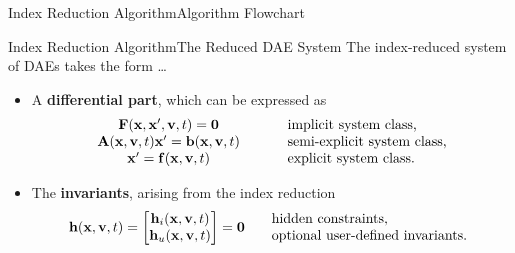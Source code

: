\begin{frame}{Index Reduction Algorithm}{Algorithm Flowchart}
  \centering
\end{frame}

\begin{frame}{Index Reduction Algorithm}{The Reduced \ac{DAE} System}
  The index-reduced system of \acp{DAE} takes the form \dots
  \begin{itemize}[<+->]
    \item A \textbf{differential part}, which can be expressed as
    \begin{equation*}
      \begin{array}{ccl}
          \mathbf{F}(\mathbf{x}, \mathbf{x}^\prime, \mathbf{v}, t) = \mathbf{0} & \hspace{0.5cm} & \text{implicit  system class,} \\
          \mathbf{A}(\mathbf{x}, \mathbf{v}, t) \mathbf{x}^\prime = \mathbf{b}(\mathbf{x}, \mathbf{v}, t) & \hspace{0.5cm} & \text{semi-explicit system class,} \\
          \mathbf{x}^\prime = \mathbf{f}(\mathbf{x}, \mathbf{v}, t) & \hspace{0.5cm} & \text{explicit system class.}
      \end{array}
    \end{equation*}
    \item The \textbf{invariants}, arising from the index reduction
    \begin{equation*}
      \mathbf{h}(\mathbf{x}, \mathbf{v}, t) = \begin{bmatrix}
          \mathbf{h}_{i}(\mathbf{x}, \mathbf{v}, t) \\
          \mathbf{h}_{u}(\mathbf{x}, \mathbf{v}, t)
      \end{bmatrix} = \mathbf{0} \hspace{0.5cm} \begin{array}{l}
        \text{hidden constraints,} \\
        \text{optional user-defined invariants.}

\end{array}
\end{equation*}
\end{itemize}
\end{frame}
